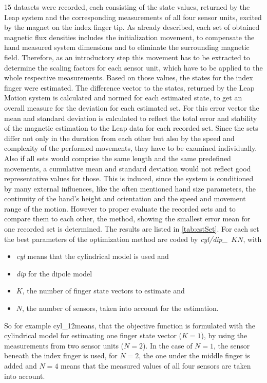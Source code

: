 15 datasets were recorded, each consisting of the state values, returned by the Leap system and the corresponding measurements of all four sensor units, excited by the magnet on the index finger tip. As already described, each set of obtained magnetic flux densities includes the initialization movement, to compensate the hand measured system dimensions and to eliminate the surrounding magnetic field. Therefore, as an introductory step this movement has to be extracted to determine the scaling factors for each sensor unit, which have to be applied to the whole respective measurements. Based on those values, the states for the index finger were estimated. The difference vector to the states, returned by the Leap Motion system is calculated and normed for each estimated state, to get an overall measure for the deviation for each estimated set. For this error vector the mean and standard deviation is calculated to reflect the total error and stability of the magnetic estimation to the Leap data for each recorded set. Since the sets differ not only in the duration from each other but also by the speed and complexity of the performed movements, they have to be examined individually. Also if all sets would comprise the same length and the same predefined movements, a cumulative mean and standard deviation would not reflect good representative values for those. This is induced, since the system is conditioned by many external influences, like the often mentioned hand size parameters, the continuity of the hand's height and orientation and the speed and movement range of the motion. However to proper evaluate the recorded sets and to compare them to each other, the method, showing the smallest error mean for one recorded set is determined. The results are listed in \ref{tab:estSet}. For each set the best parameters of the optimization method are coded by \mbox{\emph{cyl/dip\_ $ K N $}}, with
\begin{itemize}
\item \emph{cyl} means that the cylindrical model is used and 
\item \emph{dip} for the dipole model
\item $ K $, the number of finger state vectors to estimate and
\item $ N $, the number of sensors, taken into account for the estimation.
\end{itemize}
So for example \grqq cyl\_12\grqq means, that the objective function is formulated with the cylindrical model for estimating one finger state vector ($ K = 1 $), by using the measurements from two sensor units ($ N = 2 $). In the case of $ N = 1 $, the sensor beneath the index finger is used, for $ N = 2 $, the one under the middle finger is added and $ N = 4 $ means that the measured values of all four sensors are taken into account.\\
